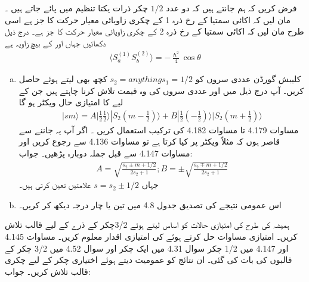

فرض کریں کہ ہم جانتے ہیں کہ دو عدد \( 1/2 \) چکر ذرات یکتا تنظیم   میں پائے جاتے ہیں ۔مان لیں کہ اکائی سمتیا  کے رخ ذرہ 1 کے چکری زاویائی معیار حرکت کا جز  ہے اسی طرح مان لیں کہ اکائی سمتیا   کے رخ ذرہ 2 کے چکری زاویائی معیار حرکت کا جز  ہے۔ درج ذیل دکھائیں جہاں  اور  کے بیچ زاویہ  ہے 
\begin{align}
    \langle S_{a}^{(1)}S_{b}^{(2)}\rangle=-\frac{\hslash^{2}}{4}\cos\theta
\end{align}
\begin{enumerate}[a.]
\item     کلیبش گورڈن عددی سروں کو \( s_1=1/2\)\( s_2=any thing\) کچھ بھی لیتے ہوئے حاصل کریں۔ آپ درج ذیل میں  اور  عددی سروں کی وہ قیمت تلاش کرنا چاہتے ہیں جن کے لیے  کا امتیازی حال ویکٹر  ہو گا 
\begin{align*}
    |sm \rangle=A|\frac{1}{2}\frac{1}{2}\rangle|S_2(m-\frac{1}{2})\rangle+B|\frac{1}{2}(-\frac{1}{2})\rangle|S_2(m+\frac{1}{2})\rangle
\end{align*} 
مساوات 4.179 تا مساوات 4.182 کی ترکیب استعمال کریں ۔ اگر آپ یہ جاننے سے قاصر ہوں کہ  مثلاً ویکٹر  پر کیا کرتا ہے تو مساوات 4.136 سے رجوع کریں اور مساوات 4.147  سے قبل جملہ دوبارہ پڑھیں۔ جواب:
\begin{align*}
    A=\sqrt{\frac{s_2\pm m+1/2}{2s_2+1}}; 
     B=\pm \sqrt{\frac{s_2\mp m+1/2}{2s_2+1}} 
\end{align*}
جہاں  \( s=s_2\pm1/2 \)  علامتیں تعین کرتی ہیں۔
\item اس عمومی نتیجے کی تصدیق جدول 4.8 میں تین یا چار درجہ دیکھ کر کریں۔
\end{enumerate}
ہمیشہ کی طرح  کی امتیازی حالات کو اساس لیتے ہوئے 3/2چکر کے ذرے کے لیے قالب  تلاش کریں۔ امتیازی مساوات حل کرتے ہوئے  کی امتیازی اقدار معلوم کریں۔
مساوات 4.145 اور 4.147 میں 1/2 چکر سوال 4.31 میں ایک چکر اور سوال 4.52 میں 3/2 چکر کے قالبوں کی بات کی گئی۔ ان نتائج کو عمومیت دیتے ہوئے اختیاری  چکر کے لیے چکری قالب تلاش کریں۔
جواب:
